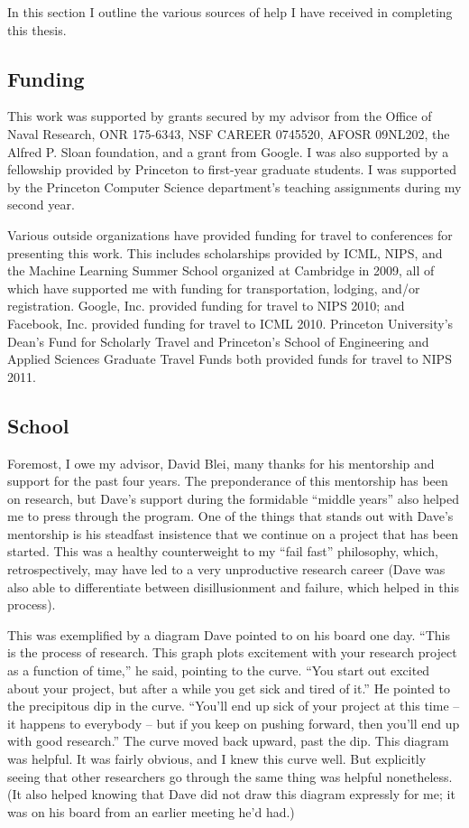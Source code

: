 In this section I outline the various sources of help I have received
in completing this thesis.

\subsection*{Funding}
This work was supported by grants secured by my advisor from the
Office of Naval Research, ONR 175-6343, NSF CAREER 0745520, AFOSR
09NL202, the Alfred P. Sloan foundation, and a grant from Google.  I
was also supported by a fellowship provided by Princeton to first-year
graduate students.  I was supported by the Princeton Computer Science
department's teaching assignments during my second year.

Various outside organizations have provided funding for travel to
conferences for presenting this work.  This includes scholarships
provided by ICML, NIPS, and the Machine Learning Summer School
organized at Cambridge in 2009, all of which have supported me with
funding for transportation, lodging, and/or registration.  Google,
Inc. provided funding for travel to NIPS 2010; and Facebook,
Inc. provided funding for travel to ICML 2010.  Princeton University's
Dean's Fund for Scholarly Travel and Princeton's School of Engineering
and Applied Sciences Graduate Travel Funds both provided funds for
travel to NIPS 2011.

\subsection*{School}
Foremost, I owe my advisor, David Blei, many thanks for his mentorship
and support for the past four years.  The preponderance of this
mentorship has been on research, but Dave's support during the
formidable ``middle years'' also helped me to press through the
program.  One of the things that stands out with Dave's mentorship is
his steadfast insistence that we continue on a project that has been
started.  This was a healthy counterweight to my ``fail fast''
philosophy, which, retrospectively, may have led to a very
unproductive research career (Dave was also able to differentiate
between disillusionment and failure, which helped in this process).

This was exemplified by a diagram Dave pointed to on his board one
day.  ``This is the process of research.  This graph plots excitement
with your research project as a function of time,'' he said, pointing
to the curve.  ``You start out excited about your project, but after a
while you get sick and tired of it.''  He pointed to the precipitous
dip in the curve.  ``You'll end up sick of your project at this time
-- it happens to everybody -- but if you keep on pushing forward, then
you'll end up with good research.''  The curve moved back upward, past
the dip.  This diagram was helpful.  It was fairly obvious, and I knew
this curve well.  But explicitly seeing that other researchers go
through the same thing was helpful nonetheless.  (It also helped
knowing that Dave did not draw this diagram expressly for me; it was
on his board from an earlier meeting he'd had.)


